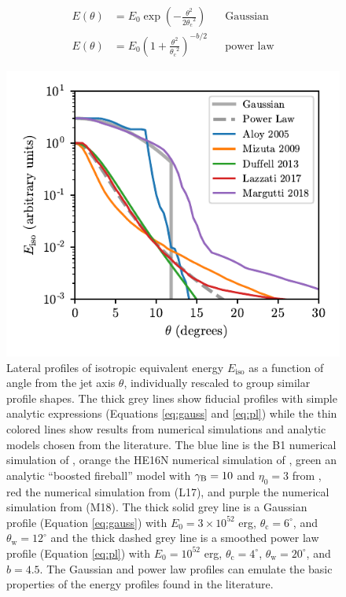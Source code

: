 \documentclass[twocolumn]{aastex62}
\newcommand{\thW}{\ensuremath{\theta_{\mathrm{w}}}}
\newcommand{\thC}{\ensuremath{\theta_{\mathrm{c}}}}
\newcommand{\Eiso}{\ensuremath{E_{\mathrm{iso}}}}
\begin{document}
\begin{align}
	E(\theta) &= E_0 \exp\left(-\frac{\theta^2}{2\thC^2}\right)  && \text{Gaussian} \label{eq:gauss}\\
	E(\theta) &= E_0 \left(1 + \frac{\theta^2}{\thC^2} \right)^{-b/2}  && \text{power law} \label{eq:pl}
\end{align}

%
%

\begin{figure}
	\includegraphics[width=\columnwidth]{figs/jetStructureComparison.pdf}
	\caption{Lateral profiles of isotropic equivalent energy $\Eiso$ as a function of angle from the jet axis $\theta$, individually rescaled to group similar profile shapes.  The thick grey lines show fiducial profiles with simple analytic expressions (Equations \eqref{eq:gauss} and \eqref{eq:pl}) while the thin colored lines show results from numerical simulations and analytic models chosen from the literature.  The blue line is the B1 numerical simulation of \cite{Aloy:2005aa}, orange the HE16N numerical simulation of \cite{Mizuta:2009aa}, green an analytic ``boosted fireball'' model with $\gamma_{\rm{B}}=10$ and $\eta_0=3$ from \cite{Duffell:2013aa}, red the numerical simulation from \cite{Lazzati:2017aa} (L17), and purple the numerical simulation from \cite{Margutti:2018aa} (M18).  The thick solid grey line is a Gaussian profile (Equation \eqref{eq:gauss}) with $E_0 = 3\times 10^{52}$ erg, $\thC = 6^\circ$, and $\thW=12^\circ$ and the thick dashed grey line is a smoothed power law profile (Equation \eqref{eq:pl}) with $E_0 = 10^{52}$ erg, $\thC = 4^\circ$, $\thW=20^\circ$, and $b=4.5$.  The Gaussian and power law profiles can emulate the basic properties of the energy profiles found in the literature. \label{fig:jetStruct}}
\end{figure}
\end{document}
